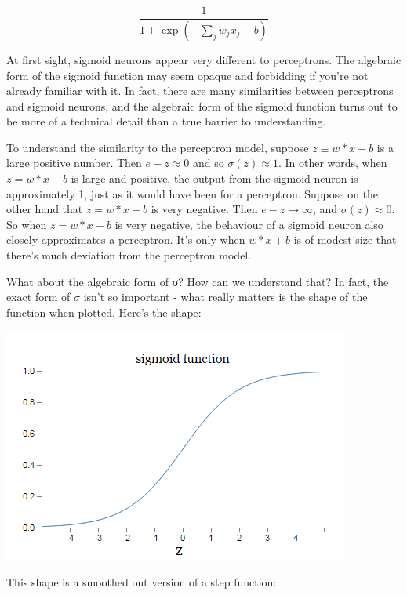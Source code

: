 \documentclass[a4paper,12pt]{report}%
\begin{document}
\begin{equation}
\frac{1} {1+ \exp(−\sum_{j} w_{j} x_{j} − b )}
\end{equation}

At first sight, sigmoid neurons appear very different to perceptrons. The algebraic form of the sigmoid function may seem opaque and forbidding if you're not already familiar with it. In fact, there are many similarities between perceptrons and sigmoid neurons, and the algebraic form of the sigmoid function turns out to be more of a technical detail than a true barrier to understanding.

To understand the similarity to the perceptron model, suppose $ z \equiv w*x + b $ is a large positive number. Then $ e−z ≈ 0 $ and so $ σ(z) ≈ 1 $. In other words, when $ z = w*x + b $ is large and positive, the output from the sigmoid neuron is approximately 1, just as it would have been for a perceptron. Suppose on the other hand that $z = w*x + b$ is very negative. Then $ e - z → ∞ $, and $ \sigma(z) \approx 0 $. So when $z = w*x + b$ is very negative, the behaviour of a sigmoid neuron also closely approximates a perceptron. It's only when $ w*x + b $ is of modest size that there's much deviation from the perceptron model.

What about the algebraic form of σ? How can we understand that? In fact, the exact form of $\sigma$ isn't so important - what really matters is the shape of the function when plotted. Here's the shape:

\begin{center}
 \includegraphics[width=0.5\linewidth]{images/sigmoid.png}
\end{center}

This shape is a smoothed out version of a step function:
\end{document}
